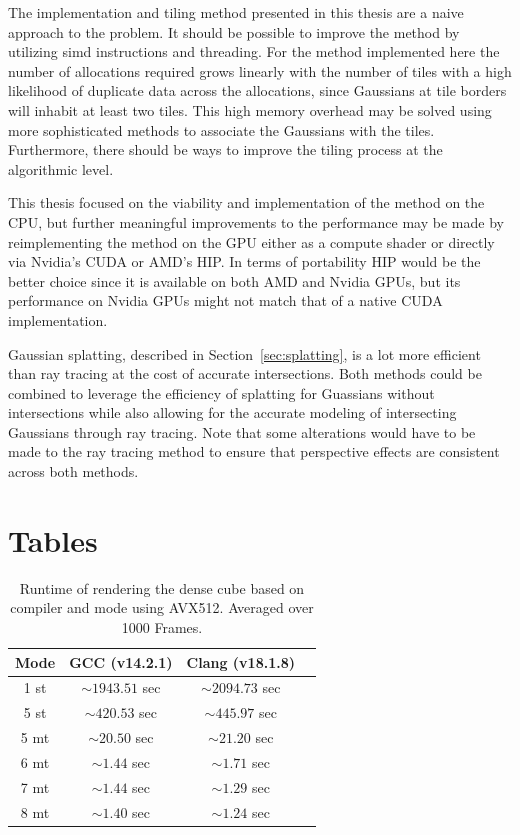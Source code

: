 \documentclass[a4paper, 11pt]{memoir}
\begin{document}
    The implementation and tiling method presented in this thesis are a naive approach to the problem. It should be possible
    to improve the method by utilizing \gls{simd} instructions and threading. For the method implemented here the number
    of allocations required grows linearly with the number of tiles with a high likelihood of duplicate data across the
    allocations, since Gaussians at tile borders will inhabit at least two tiles. This high memory overhead may be solved
    using more sophisticated methods to associate the Gaussians with the tiles. Furthermore, there should be ways to
    improve the tiling process at the algorithmic level.

    This thesis focused on the viability and implementation of the method on the CPU, but further meaningful improvements
    to the performance may be made by reimplementing the method on the GPU either as a compute shader or directly via
    Nvidia's CUDA or AMD's HIP. In terms of portability HIP would be the better choice since it is available on both AMD
    and Nvidia GPUs, but its performance on Nvidia GPUs might not match that of a native CUDA implementation.

    Gaussian splatting, described in Section~\ref{sec:splatting}, is a lot more efficient than ray tracing at the cost
    of accurate intersections. Both methods could be combined to leverage the efficiency of splatting for Guassians
    without intersections while also allowing for the accurate modeling of intersecting Gaussians through ray tracing.
    Note that some alterations would have to be made to the ray tracing method to ensure that perspective effects are
    consistent across both methods.

    \appendix
    \chapter{Tables}
    \label{ch:tables}
    \begin{table}[ht]
        \centering
        \begin{tabular}{|c | c | c | c|}
            \hline
            Mode & GCC (v14.2.1)     & Clang (v18.1.8)\\\hline
            1 st & $\sim1943.51$ sec & $\sim2094.73$ sec\\
            5 st & $\sim420.53$ sec  & $\sim445.97$ sec\\
            5 mt & $\sim20.50$ sec   & $\sim21.20$ sec \\
            6 mt & $\sim1.44$ sec    & $\sim1.71$ sec \\
            7 mt & $\sim1.44$ sec    & $\sim1.29$ sec \\
            8 mt & $\sim1.40$ sec    & $\sim1.24$ sec \\
            \hline
        \end{tabular}
        \caption{Runtime of rendering the dense cube based on compiler and mode using AVX512. Averaged over 1000 Frames.}
        \label{tab:perf_dense_cube_avx512}
    \end{table}
\end{document}
